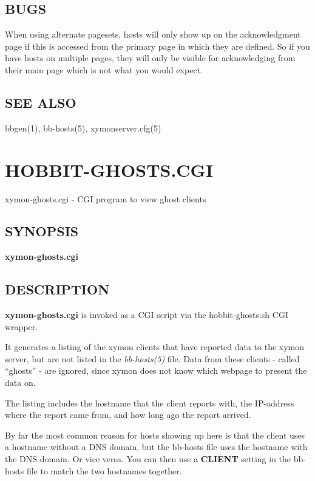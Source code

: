 \subsection{BUGS}
 When using alternate pagesets, hosts will only show up on the
 acknowledgment page if this is accessed from the primary page in
 which they are defined. So if you have hosts on multiple pages, they
 will only be visible for acknowledging from their main page which is
 not what you would expect. 

 
\subsection{SEE ALSO}
bbgen(1), bb-hosts(5), xymonserver.cfg(5) 


%
\newpage
\section{HOBBIT-GHOSTS.CGI}
 xymon-ghosts.cgi - CGI program to view ghost clients
 \subsection{SYNOPSIS}
\textbf{xymon-ghosts.cgi}


 
\subsection{DESCRIPTION}
\textbf{xymon-ghosts.cgi} is invoked as a CGI script via the hobbit-ghosts.sh CGI wrapper. 

  It generates a listing of the xymon clients that have reported data
  to the xymon server, but are not listed in the \emph{bb-hosts(5)}
  file. Data from these clients - called ``ghosts'' - are ignored,
  since xymon does not know which webpage to present the data on. 



  The listing includes the hostname that the client reports with, the
  IP-address where the report came from, and how long ago the report
  arrived. 



  By far the most common reason for hosts showing up here is that the
  client uses a hostname without a DNS domain, but the bb-hosts file
  uses the hostname with the DNS domain. Or vice versa. You can then
  use a \textbf{CLIENT} setting in the bb-hosts file to match the two
  hostnames together. 



